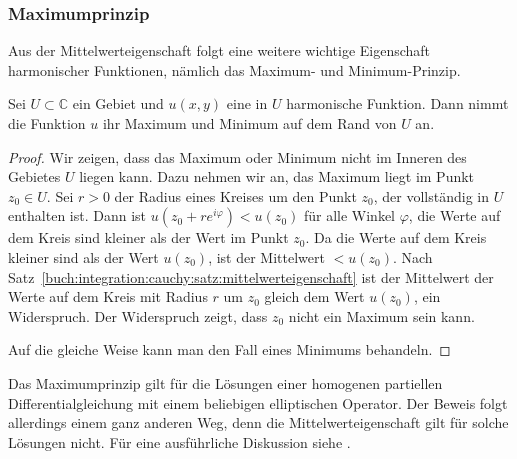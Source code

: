 %
%
\subsubsection{Maximumprinzip}
Aus der Mittelwerteigenschaft folgt eine weitere wichtige Eigenschaft
harmonischer Funktionen, nämlich das Maximum- und Minimum-Prinzip.

\begin{satz}[Maximumprinzip]
%
Sei $U\subset\mathbb{C}$ ein Gebiet und $u(x,y)$ eine in $U$ harmonische
Funktion.
Dann nimmt die Funktion $u$ ihr Maximum und Minimum auf dem Rand von $U$ an.
\end{satz}

\begin{proof}
Wir zeigen, dass das Maximum oder Minimum nicht im Inneren des Gebietes
$U$ liegen kann.
Dazu nehmen wir an, das Maximum liegt im Punkt $z_0\in U$.
Sei $r>0$ der Radius eines Kreises um den Punkt $z_0$, der vollständig
in $U$ enthalten ist.
Dann ist $u(z_0+ re^{i\varphi}) < u(z_0)$ für alle Winkel $\varphi$,
die Werte auf dem Kreis sind kleiner als der Wert im Punkt $z_0$.
Da die Werte auf dem Kreis kleiner sind als der Wert $u(z_0)$,
ist der Mittelwert $<u(z_0)$.
Nach Satz~\ref{buch:integration:cauchy:satz:mittelwerteigenschaft} ist
der Mittelwert der Werte auf dem Kreis mit Radius $r$ um $z_0$ gleich dem
Wert $u(z_0)$, ein Widerspruch.
Der Widerspruch zeigt, dass $z_0$ nicht ein Maximum sein kann.

Auf die gleiche Weise kann man den Fall eines Minimums behandeln.
\end{proof}

Das Maximumprinzip gilt für die Lösungen einer homogenen partiellen
Differentialgleichung mit einem beliebigen elliptischen Operator.
Der Beweis folgt allerdings einem ganz anderen Weg, denn die
Mittelwerteigenschaft gilt für solche Lösungen nicht.
Für eine ausführliche Diskussion siehe \cite[section 6.4]{buch:evans}.
